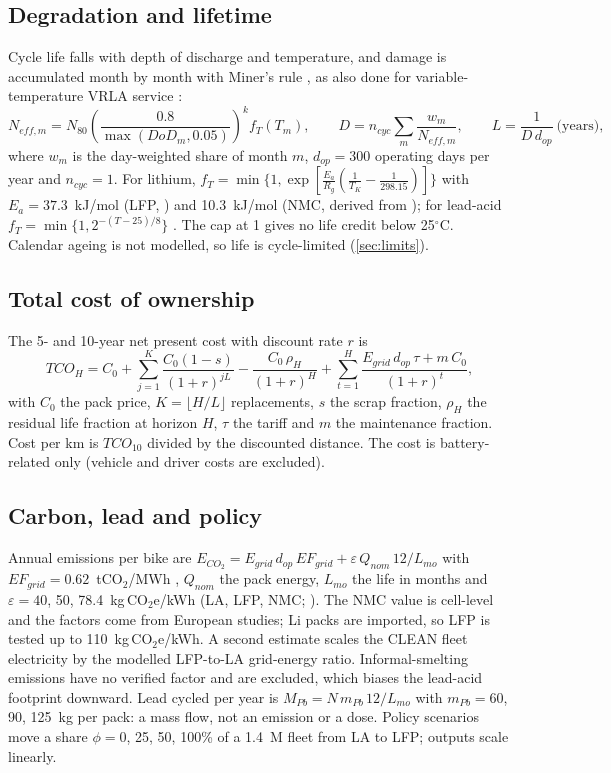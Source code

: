 \subsection{Degradation and lifetime}
Cycle life falls with depth of discharge and temperature, and damage is accumulated month by month with Miner's rule \citep{miner1945}, as also done for variable-temperature VRLA service \citep{tsujikawa2009}:
\begin{equation}
N_{eff,m}=N_{80}\left(\frac{0.8}{\max(DoD_m,0.05)}\right)^{k} f_T(T_m),\qquad
D=n_{cyc}\sum_m \frac{w_m}{N_{eff,m}},\qquad
L=\frac{1}{D\,d_{op}}\ \text{(years)},
\end{equation}
where $w_m$ is the day-weighted share of month $m$, $d_{op}=300$ operating days per year and $n_{cyc}=1$. For lithium, $f_T=\min\{1,\exp[\tfrac{E_a}{R_g}(\tfrac1{T_K}-\tfrac1{298.15})]\}$ with $E_a=37.3$~kJ/mol (LFP, \citep{yagci2026}) and 10.3~kJ/mol (NMC, derived from \citep{jalkanen2015}); for lead-acid $f_T=\min\{1,2^{-(T-25)/8}\}$ \citep{bu806a}. The cap at 1 gives no life credit below 25$^\circ$C. Calendar ageing is not modelled, so life is cycle-limited (\cref{sec:limits}).

\subsection{Total cost of ownership}
The 5- and 10-year net present cost with discount rate $r$ is
\begin{equation}
TCO_H=C_0+\sum_{j=1}^{K}\frac{C_0(1-s)}{(1+r)^{jL}}-\frac{C_0\,\rho_H}{(1+r)^{H}}+\sum_{t=1}^{H}\frac{E_{grid}\,d_{op}\,\tau + m\,C_0}{(1+r)^t},
\end{equation}
with $C_0$ the pack price, $K=\lfloor H/L\rfloor$ replacements, $s$ the scrap fraction, $\rho_H$ the residual life fraction at horizon $H$, $\tau$ the tariff and $m$ the maintenance fraction. Cost per km is $TCO_{10}$ divided by the discounted distance. The cost is battery-related only (vehicle and driver costs are excluded).

\subsection{Carbon, lead and policy}
Annual emissions per bike are $E_{CO_2}=E_{grid}\,d_{op}\,EF_{grid}+\varepsilon\,Q_{nom}\,12/L_{mo}$ with $EF_{grid}=0.62$~tCO$_2$/MWh \citep{doe_gef}, $Q_{nom}$ the pack energy, $L_{mo}$ the life in months and $\varepsilon=40$, 50, 78.4~kg\,CO$_2$e/kWh (LA, LFP, NMC; \citep{jasper2025,paul2024}). The NMC value is cell-level and the factors come from European studies; Li packs are imported, so LFP is tested up to 110~kg\,CO$_2$e/kWh. A second estimate scales the CLEAN fleet electricity by the modelled LFP-to-LA grid-energy ratio. Informal-smelting emissions have no verified factor and are excluded, which biases the lead-acid footprint downward. Lead cycled per year is $M_{Pb}=N\,m_{Pb}\,12/L_{mo}$ with $m_{Pb}=60$, 90, 125~kg per pack: a mass flow, not an emission or a dose. Policy scenarios move a share $\phi=0$, 25, 50, 100\% of a 1.4~M fleet from LA to LFP; outputs scale linearly.

